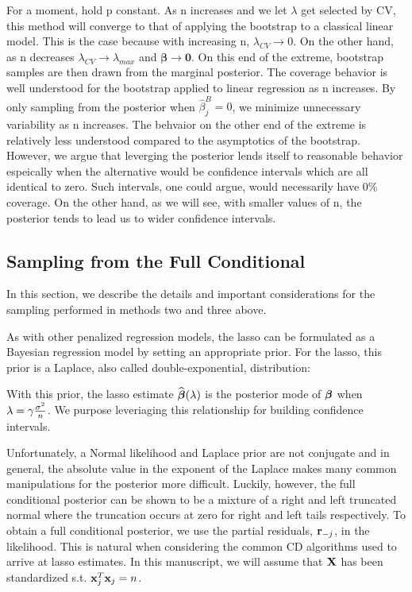 For a moment, hold p constant. As n increases and we let $\lambda$ get selected by CV, this method will converge to that of applying the bootstrap to a classical linear model. This is the case because with increasing n, $\lambda_{CV} \rightarrow 0$. On the other hand, as n decreases $\lambda_{CV} \rightarrow \lambda_{max}$ and $\boldsymbol{\beta} \rightarrow \boldsymbol{0}$. On this end of the extreme, bootstrap samples are then drawn from the marginal posterior. The coverage behavior is well understood for the bootstrap applied to linear regression as n increases. By only sampling from the posterior when $\hat{\beta}_j^B = 0$, we minimize unnecessary variability as n increases. The behvaior on the other end of the extreme is relatively less understood compared to the asymptotics of the bootstrap. However, we argue that leverging the posterior lends itself to reasonable behavior espeically when the alternative would be confidence intervals which are all identical to zero. Such intervals, one could argue, would necessarily have 0\% coverage. On the other hand, as we will see, with smaller values of n, the posterior tends to lead us to wider confidence intervals.

\subsection{Sampling from the Full Conditional}

In this section, we describe the details and important considerations for the sampling performed in methods two and three above.

As with other penalized regression models, the lasso can be formulated as a Bayesian regression model by setting an appropriate prior. For the lasso, this prior is a Laplace, also called double-exponential, distribution:


With this prior, the lasso estimate $\widehat{\boldsymbol{\beta}}(\lambda)$ is the posterior mode of $\boldsymbol{\beta}$ when $\lambda = \gamma \frac{\sigma^2}{n}$. We purpose leveriaging this relationship for building confidence intervals.

Unfortunately, a Normal likelihood and Laplace prior are not conjugate and in general, the absolute value in the exponent of the Laplace makes many common manipulations for the posterior more difficult. Luckily, however, the full conditional posterior can be shown to be a mixture of a right and left truncated normal where the truncation occurs at zero for right and left tails respectively. To obtain a full conditional posterior, we use the partial residuals, $\mathbf{r}_{-j}$, in the likelihood. This is natural when considering the common CD algorithms used to arrive at lasso estimates. In this manuscript, we will assume that $\mathbf{X}$ has been standardized s.t. $\mathbf{x}_j^T\mathbf{x}_j = n$.


